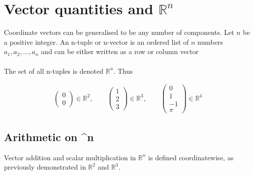 \documentclass{report}
\begin{document}
\section{Vector quantities and $\mathbb{R}^n$}
		
	Coordinate vectors can be generalised to be any number of components. Let $n$ be a positive integer. An n-tuple or n-vector is an ordered list of $n$ numbers $a_1, a_2, \dots ,a_n$ and can be either written as a row or column vector
	\\ \\
	The set of all n-tuples is denoted $\mathbb{R}^n$. Thus

		\begin{align*}
			\begin{pmatrix}0\\0\end{pmatrix} \in \mathbb{R}^2, \qquad \begin{pmatrix}1\\2\\3\end{pmatrix} \in \mathbb{R}^3, \qquad \begin{pmatrix}0\\1\\-1\\\pi\end{pmatrix} \in \mathbb{R}^4
		\end{align*}

	\subsection{Arithmetic on ^n}

		Vector addition and scalar multiplication in $\mathbb{R}^n$ is defined coordinatewise, as previously demonstrated in $\mathbb{R}^2$ and $\mathbb{R}^3$.
\end{document}
